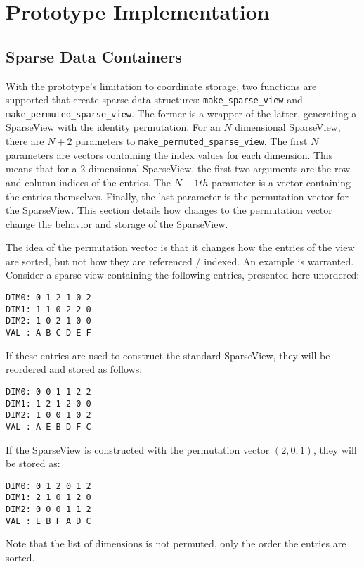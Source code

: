 \section{Prototype Implementation}


\subsection{Sparse Data Containers}

With the prototype's limitation to coordinate storage, two functions are supported that create sparse data structures: \verb.make_sparse_view. and \verb.make_permuted_sparse_view..
The former is a wrapper of the latter, generating a SparseView with the identity permutation.
For an $N$ dimensional SparseView, there are $N+2$ parameters to \verb.make_permuted_sparse_view..
The first $N$ parameters are vectors containing the index values for each dimension. 
This means that for a 2 dimensional SparseView, the first two arguments are the row and column indices of the entries.
The $N+1th$ parameter is a vector containing the entries themselves. 
Finally, the last parameter is the permutation vector for the SparseView. 
This section details how changes to the permutation vector change the behavior and storage of the SparseView.

The idea of the permutation vector is that it changes how the entries of the view are sorted, but not how they are referenced / indexed.
An example is warranted. 
Consider a sparse view containing the following entries, presented here unordered:
\begin{lstlisting}
DIM0: 0 1 2 1 0 2
DIM1: 1 1 0 2 2 0
DIM2: 1 0 2 1 0 0
VAL : A B C D E F 
\end{lstlisting}
If these entries are used to construct the standard SparseView, they will be reordered and stored as follows:
\begin{lstlisting}
DIM0: 0 0 1 1 2 2
DIM1: 1 2 1 2 0 0
DIM2: 1 0 0 1 0 2
VAL : A E B D F C
\end{lstlisting}
If the SparseView is constructed with the permutation vector $(2,0,1)$, they will be stored as:
\begin{lstlisting}
DIM0: 0 1 2 0 1 2
DIM1: 2 1 0 1 2 0
DIM2: 0 0 0 1 1 2
VAL : E B F A D C
\end{lstlisting}
Note that the list of dimensions is not permuted, only the order the entries are sorted. 

